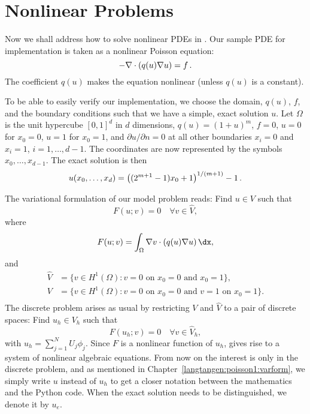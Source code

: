 \section{Nonlinear Problems}
\label{langtangen:poisson:nonlinear}



Now we shall address how to solve nonlinear PDEs in \fenics. Our
sample PDE for implementation is taken as a nonlinear Poisson equation:
\begin{equation}
-\nabla\cdot\left( q(u)\nabla u\right) = f\thinspace .
\end{equation}
The coefficient $q(u)$ makes the equation nonlinear (unless $q(u)$
is a constant).

To be able to easily verify our implementation, 
we choose the domain, $q(u)$, $f$, and the boundary
conditions such that we have
a simple, exact solution $u$. Let 
$\Omega$ is the unit hypercube $[0, 1]^d$
in $d$ dimensions, $q(u)=(1+u)^m$, $f=0$, $u=0$ for $x_0=0$, $u=1$
for $x_0=1$, and $\partial u/\partial n=0$ at all other boundaries
$x_i=0$ and $x_i=1$, $i=1,\ldots,d-1$. The coordinates are now represented by
the symbols $x_0,\ldots,x_{d-1}$. The exact solution is then
\begin{equation}
u(x_0,\ldots,x_d) = \left((2^{m+1}-1)x_0 + 1\right)^{1/(m+1)} - 1\thinspace .
\end{equation}

The variational formulation of our model problem reads:
Find $u \in V$ such that
\begin{equation} \label{langtangen:poisson:nonlinear}
  F(u; v) = 0 \quad \forall v \in \hat{V},
\end{equation}
where
\begin{equation}
\label{langtangen:poisson:nonlinear2}
F(u; v) = \int_\Omega \nabla v\cdot\left( q(u)\nabla u\right)\dx,
\end{equation}
and
\begin{displaymath}
  \begin{split}
    \hat{V} &= \{v \in H^1(\Omega) : v = 0 \mbox{ on } x_0=0\mbox{ and }x_0=1\}, \\
     V      &= \{v \in H^1(\Omega) : v = 0 \mbox{ on } x_0=0\mbox{ and } v = 1\mbox{ on }x_0=1\}. \\
  \end{split}
\end{displaymath}
The discrete problem arises as usual by restricting $V$ and $\hat V$ to a
pair of discrete spaces: Find $u_h\in V_h$ such that
\begin{equation}
  F(u_h; v) = 0 \quad \forall v \in \hat{V}_h,
\label{langtangen:poisson:nonlinear:d}
\end{equation}
with $u_h = \sum_{j=1}^N U_j \phi_j$. Since $F$ is a nonlinear function
of $u_h$,  gives rise to a system of
nonlinear algebraic equations.
From now on the interest is only in the discrete problem, and as mentioned
in Chapter~\ref{langtangen:poisson1:varform}, 
we simply write $u$ instead of $u_h$ to get a closer notation between
the mathematics and the Python code. When the exact solution needs to
be distinguished, we denote it by $u_e$.

